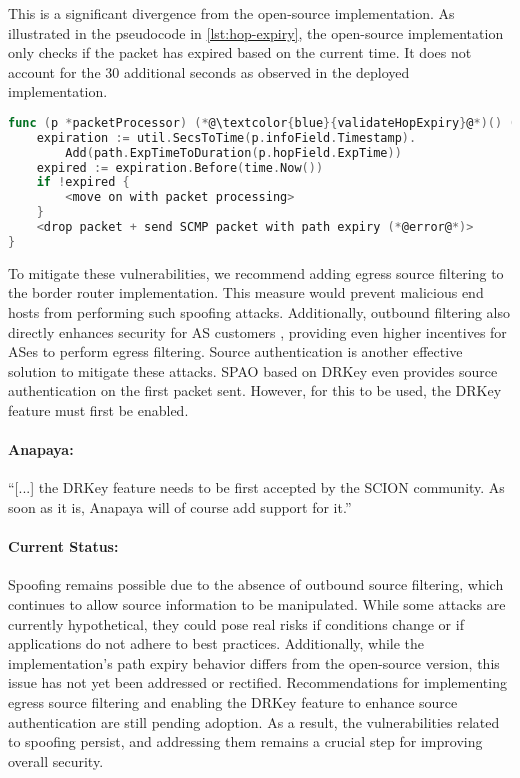 This is a significant divergence from the open-source implementation.
As illustrated in the pseudocode in \cref{lst:hop-expiry}, the open-source implementation only checks if the packet has expired based on the current time.
It does not account for the 30 additional seconds as observed in the deployed implementation.



\begin{lstlisting}[language={Go}, morekeywords={}, caption={Pseudocode of hop expiry check in open-source implementation of the border router.}, label={lst:hop-expiry}]
func (p *packetProcessor) (*@\textcolor{blue}{validateHopExpiry}@*)() (processResult, error) {
    expiration := util.SecsToTime(p.infoField.Timestamp).
        Add(path.ExpTimeToDuration(p.hopField.ExpTime))
    expired := expiration.Before(time.Now())
    if !expired {
        <move on with packet processing>
    }
    <drop packet + send SCMP packet with path expiry (*@error@*)>
}
\end{lstlisting}


To mitigate these vulnerabilities, we recommend adding egress source filtering to the border router implementation.
This measure would prevent malicious end hosts from performing such spoofing attacks.
Additionally, outbound filtering also directly enhances security for AS customers \cite[Section 7.7.3]{Perrig2022}, providing even higher incentives for ASes to perform egress filtering.
Source authentication is another effective solution to mitigate these attacks.
SPAO based on DRKey even provides source authentication on the first packet sent.
However, for this to be used, the DRKey feature must first be enabled.
\newpage
\begin{boxH}
    \paragraph{Anapaya:}
    ``[...] the DRKey feature needs to be first accepted by the SCION community. As soon as it is, Anapaya will of course add support for it.''
\end{boxH}


\paragraph{Current Status:}
Spoofing remains possible due to the absence of outbound source filtering, which continues to allow source information to be manipulated.
While some attacks are currently hypothetical, they could pose real risks if conditions change or if applications do not adhere to best practices.
Additionally, while the implementation's path expiry behavior differs from the open-source version, this issue has not yet been addressed or rectified.
Recommendations for implementing egress source filtering and enabling the DRKey feature to enhance source authentication are still pending adoption.
As a result, the vulnerabilities related to spoofing persist, and addressing them remains a crucial step for improving overall security.


